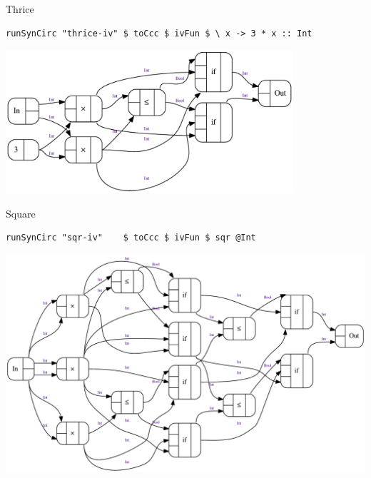 \documentclass[10pt]{beamer}
\theoremstyle{definition}
\theoremstyle{remark}
\numberwithin{equation}{section}
\begin{document}
\begin{frame}[fragile]{Thrice}
  \begin{lstlisting}[frame=single]
     runSynCirc "thrice-iv" $ toCcc $ ivFun $ \ x -> 3 * x :: Int
  \end{lstlisting}
  \begin{center}
    \includegraphics[width=0.8\textwidth]{thrice-iv.pdf}
  \end{center}
\end{frame}

\begin{frame}[fragile]{Square}
  \begin{lstlisting}[frame=single]
    runSynCirc "sqr-iv"    $ toCcc $ ivFun $ sqr @Int
  \end{lstlisting}
  \begin{center}
    \includegraphics[width=1.0\textwidth]{sqr-iv.pdf}
  \end{center}
\end{frame}
\end{document}
